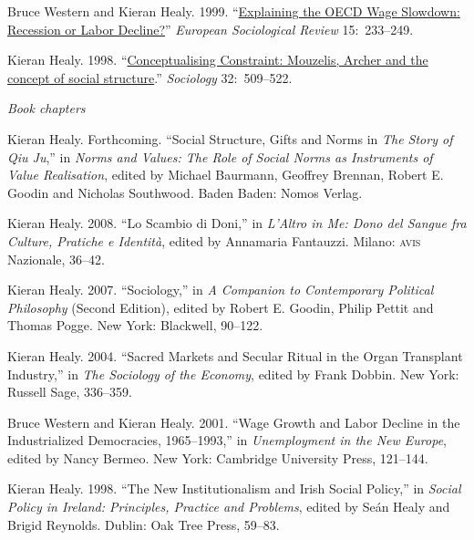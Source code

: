 \documentclass[11pt,article,oneside]{memoir}
\begin{document}
\ind Bruce Western and Kieran Healy. 1999. ``\href{http://www.kieranhealy.org/files/papers/western-healy99.pdf}{Explaining the OECD Wage Slowdown:
Recession or Labor Decline?}''  \emph{European Sociological Review}
15:~233--249.


\ind  Kieran Healy. 1998.  ``\href{http://www.kieranhealy.org/files/papers/constraint98.pdf}{Conceptualising Constraint: Mouzelis, Archer and the concept of
  social structure}.'' \emph{Sociology} 32:~509--522. 

\bigskip

\noindent\emph{Book chapters \vspace{0.05in}}

\ind Kieran Healy. Forthcoming. ``Social Structure, Gifts and Norms in \emph{The Story of Qiu Ju},'' in \emph{Norms and Values: The Role of Social Norms as Instruments of Value Realisation}, edited by Michael Baurmann, Geoffrey Brennan, Robert E. Goodin and Nicholas Southwood. Baden Baden: Nomos Verlag.

\ind Kieran Healy. 2008. ``Lo Scambio di Doni,'' in \emph{L'Altro in Me: Dono del Sangue fra Culture, Pratiche e Identità}, edited by Annamaria Fantauzzi. Milano: \textsc{avis} Nazionale, 36--42. 

\ind Kieran Healy. 2007. ``Sociology,'' in \emph{A Companion to Contemporary Political Philosophy} (Second Edition), edited by Robert E. Goodin, Philip Pettit and Thomas Pogge. New York: Blackwell, 90--122. 

\ind  Kieran Healy. 2004. ``Sacred Markets and Secular Ritual in the Organ Transplant
Industry,'' in \emph{The Sociology of the Economy}, edited by Frank Dobbin. New
York: Russell Sage, 336--359.

\ind Bruce Western and Kieran Healy.  2001.  ``Wage Growth and Labor Decline in the
Industrialized Democracies, 1965--1993,'' in \emph{Unemployment in the New
  Europe}, edited by Nancy Bermeo. New York: Cambridge University Press,
121--144.

 \ind  Kieran Healy. 1998. ``The New Institutionalism and Irish Social Policy,'' in
\emph{Social Policy in Ireland: Principles, Practice and Problems}, edited by
Se\'{a}n Healy and Brigid Reynolds. Dublin: Oak Tree Press, 59--83.


\end{document}
